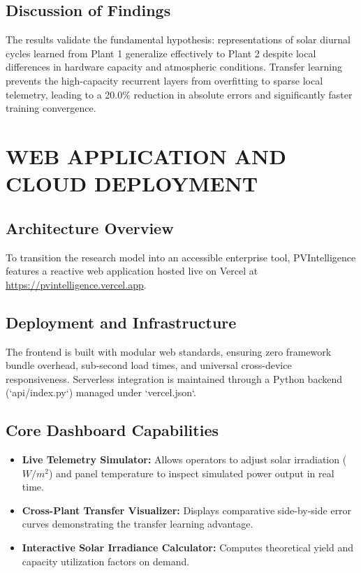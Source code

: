 \documentclass[12pt,a4paper,oneside]{report}
\begin{document}
\section{Discussion of Findings}
The results validate the fundamental hypothesis: representations of solar diurnal cycles learned from Plant 1 generalize effectively to Plant 2 despite local differences in hardware capacity and atmospheric conditions. Transfer learning prevents the high-capacity recurrent layers from overfitting to sparse local telemetry, leading to a 20.0\% reduction in absolute errors and significantly faster training convergence.

\newpage
\chapter{WEB APPLICATION AND CLOUD DEPLOYMENT}

\section{Architecture Overview}
To transition the research model into an accessible enterprise tool, PVIntelligence features a reactive web application hosted live on Vercel at \url{https://pvintelligence.vercel.app}.

\section{Deployment and Infrastructure}
The frontend is built with modular web standards, ensuring zero framework bundle overhead, sub-second load times, and universal cross-device responsiveness. Serverless integration is maintained through a Python backend (`api/index.py`) managed under `vercel.json`.

\section{Core Dashboard Capabilities}
\begin{itemize}
    \item \textbf{Live Telemetry Simulator:} Allows operators to adjust solar irradiation ($W/m^2$) and panel temperature to inspect simulated power output in real time.
    \item \textbf{Cross-Plant Transfer Visualizer:} Displays comparative side-by-side error curves demonstrating the transfer learning advantage.
    \item \textbf{Interactive Solar Irradiance Calculator:} Computes theoretical yield and capacity utilization factors on demand.
\end{itemize}
\end{document}
